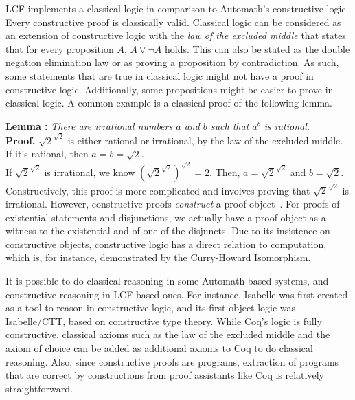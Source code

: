 \documentclass{article}
\begin{document}
	LCF implements a classical logic
	in comparison to Automath's 
	constructive logic. Every 
	constructive proof is classically 
	valid. Classical logic can 
	be considered as an extension 
	of constructive 
	logic with the 
	\textit{law of the excluded 
	middle} that states that for 
	every proposition $A$, 
	$A \lor \neg A$ holds. This can 
	also be stated as the 
	double negation elimination 
	law or as proving a 
	proposition by contradiction. As
	such, some statements that are true 
	in classical logic might not have 
	a proof in constructive logic. 
	Additionally, some propositions might 
	be easier to prove in classical 
	logic. A common example is a 
	classical proof of the 
	following lemma. 
	
	\textbf{Lemma : } \textit{There are 
	irrational numbers $a$ and $b$ 
	such that $a^b$ is rational.}\\
	\textbf{Proof. }
	$\sqrt{2}^{\sqrt{2}}$ is either 
	rational or irrational, by the 
	law of the excluded middle. \\
	If it's rational, then 
	$a = b = \sqrt{2}$. \\
	If $\sqrt{2}^{\sqrt{2}}$ is 
	irrational, we know 
	$(\sqrt{2}^{\sqrt{2}})^{\sqrt{2}} = 
	2$. Then, $a = \sqrt{2}^{\sqrt{2}}$
	and $b = \sqrt{2}$.
	Constructively, this proof is 
	more complicated and involves 
	proving that $\sqrt{2}^{\sqrt{2}}$
	is irrational. However,
	constructive proofs 
	\textit{construct} a proof 
	object~\cite{class}. 
	For proofs of existential 
	statements and disjunctions, we 
	actually have a proof object as a 
	witness to the existential and 
	of one of the disjuncts. Due 
	to its insistence on constructive 
	objects, constructive logic has 
	a direct relation to computation, 
	which is, for instance, demonstrated 
	by the Curry-Howard Isomorphism.
	
	It is possible to do classical 
	reasoning in some Automath-based
	systems, and constructive reasoning 
	in LCF-based ones. For instance, 
	Isabelle was first created as 
	a tool to reason in constructive 
	logic, and its first object-logic
	was Isabelle/CTT, based on 
	constructive type theory. While
	Coq's logic is fully constructive,
	classical axioms such as the 
	law of the excluded middle and the 
	axiom of choice can be added as 
	additional axioms to Coq to do 
	classical reasoning. Also, since 
	constructive proofs are 
	programs, extraction of 
	programs that are correct
	by constructions from proof 
	assistants like Coq is relatively 
	straightforward.
	
\end{document}
